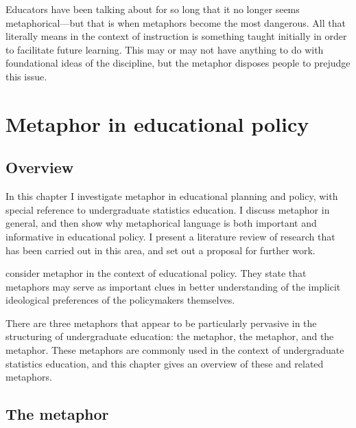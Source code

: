 \begin{savequote}[105mm]
  \begin{singlespace}
    Educators have been talking about  for so long
that it no longer seems metaphorical---but that is when metaphors
become the most dangerous.  All that  literally
means in the context of instruction is something taught initially in
order to facilitate future learning.  This may or may not have
anything to do with foundational ideas of the discipline, but the
metaphor disposes people to prejudge this issue.
\end{singlespace}
\end{savequote}

\chapter{Metaphor in educational policy}
\label{chapter2} 

\section{Overview}

In this chapter I investigate metaphor in educational planning and
policy, with special reference to undergraduate statistics education.
I discuss metaphor in general, and then show why metaphorical language
is both important and informative in educational policy.  I present a
literature review of research that has been carried out in this area, and
set out a proposal for further work.

 consider metaphor in the context of educational
policy.  They state that metaphors may serve as important clues in
better understanding of the implicit ideological preferences of the
policymakers themselves.

There are three metaphors that appear to be particularly pervasive in
the structuring of undergraduate education: the 
metaphor, the  metaphor, and the
 metaphor.  These metaphors are commonly used in
the context of undergraduate statistics education, and this chapter
gives an overview of these and related metaphors.

\section{The  metaphor}

